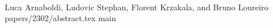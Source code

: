 \paperchapter%
  {\\ }%
  {Luca Arnaboldi, Ludovic Stephan, Florent Krzakala, and Bruno Loureiro}%
  {papers/2302/abstract.tex}
\label{chap:paper-2302}
{\let\appendix\endinput {main}}
